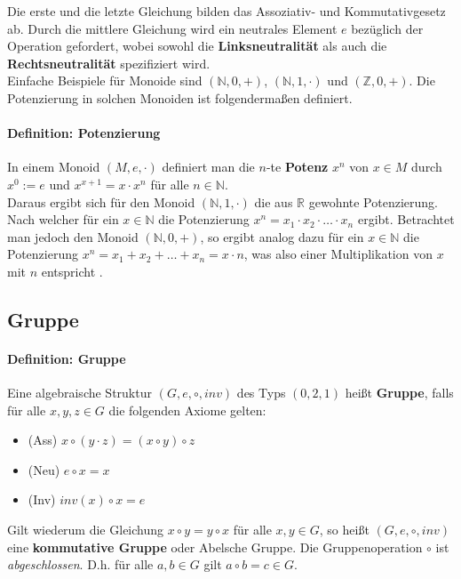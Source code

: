 Die erste und die letzte Gleichung bilden das Assoziativ- und Kommutativgesetz ab. Durch die mittlere Gleichung wird ein neutrales Element $e$ bezüglich der Operation gefordert, wobei sowohl die \textbf{Linksneutralität} als auch die \textbf{Rechtsneutralität} spezifiziert wird.\\

Einfache Beispiele für Monoide sind $(\mathbb{N},0,+)$, $(\mathbb{N},1,\cdot)$ und $(\mathbb{Z},0,+)$. Die Potenzierung in solchen Monoiden ist folgendermaßen definiert.\cite[S. 356]{Berghammer.2021}

\paragraph{Definition: Potenzierung}
In einem Monoid $(M,e,\cdot)$ definiert man die $n$-te \textbf{Potenz} $x^n$ von $x \in M$ durch $x^0 := e$ und $x^{x+1} = x \cdot x^n$ für alle $n \in \mathbb{N}$.\\

Daraus ergibt sich für den Monoid $(\mathbb{N},1,\cdot)$ die aus $\mathbb{R}$ gewohnte Potenzierung. Nach welcher für ein $x \in \mathbb{N}$ die Potenzierung $x^n = x_1 \cdot x_2 \cdot \dots \cdot x_n$ ergibt. Betrachtet man jedoch den Monoid $(\mathbb{N},0,+)$, so ergibt analog dazu für ein $x \in \mathbb{N}$ die Potenzierung $x^n = x_1 + x_2 + \dots + x_n = x \cdot n$, was also einer Multiplikation von $x$ mit $n$ entspricht \cite[S. 356, 357]{Berghammer.2021}.

\subsection{Gruppe}\label{sec:gruppe}

\paragraph{Definition: Gruppe}
Eine algebraische Struktur $(G,e,\circ,inv)$ des Typs $(0,2,1)$ heißt \textbf{Gruppe}, falls für alle $x,y,z \in G$ die folgenden Axiome gelten:

\begin{itemize}
    \item (Ass)    $x \circ (y \cdot z) = (x \circ y) \circ z$
    \item (Neu)    $e \circ x = x$
    \item (Inv)    $inv(x) \circ x = e$
\end{itemize}

Gilt wiederum die Gleichung $x \circ y = y \circ x$ für alle $x,y \in G$, so heißt $(G,e,\circ,inv)$ eine \textbf{kommutative Gruppe} oder Abelsche Gruppe. Die Gruppenoperation $\circ$ ist \textit{abgeschlossen}. D.h. für alle $a,b \in G$ gilt $a \circ b = c \in G$.

